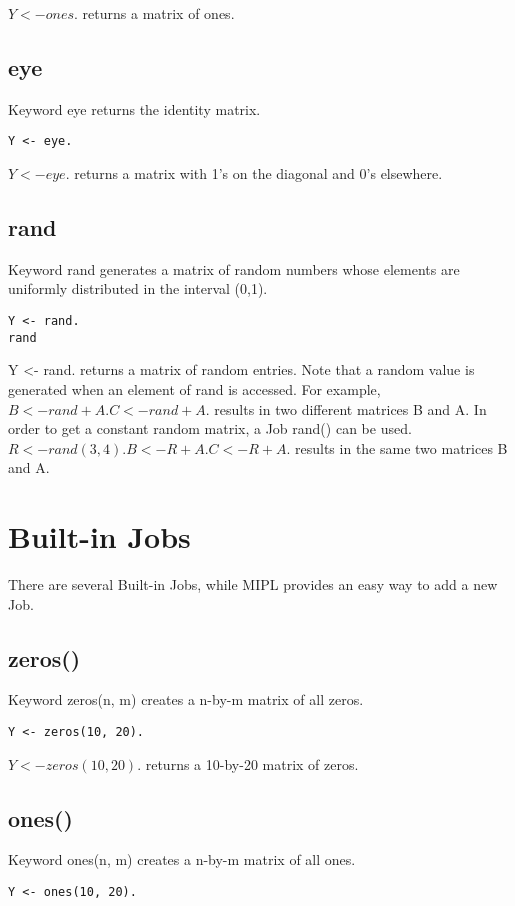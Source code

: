 \documentclass[prodmode,acmtecs]{acmsmall}
\begin{document}
$Y <- ones.$ returns a matrix of ones.
\medskip

\subsection{eye}
Keyword eye returns the identity matrix.
\begin{lstlisting}
Y <- eye.
\end{lstlisting}

$Y <- eye.$ returns a matrix with 1's on the diagonal and 0's elsewhere.
\medskip

\subsection{rand}
Keyword rand generates a matrix of random numbers whose elements are
uniformly distributed in the interval (0,1).
\begin{lstlisting}
Y <- rand.
rand
\end{lstlisting}

Y <- rand. returns a matrix of random entries. Note that a random value
is generated when an element of rand is accessed. For example,
$B <- rand + A. C <- rand + A.$ results in two different matrices B and A.
In order to get a constant random matrix, a Job rand() can be used.
$R <- rand(3,4). B <- R + A. C <- R + A.$ results in the same two matrices B
and A.


\section{Built-in Jobs}
There are several Built-in Jobs, while MIPL provides an easy way
to add a new Job.
\medskip

\subsection{zeros()}
Keyword zeros(n, m) creates a n-by-m matrix of all zeros.
\begin{lstlisting}
Y <- zeros(10, 20).
\end{lstlisting}

$Y <- zeros(10, 20).$ returns a 10-by-20 matrix of zeros.
\medskip

\subsection{ones()}
Keyword ones(n, m) creates a n-by-m matrix of all ones.
\begin{lstlisting}
Y <- ones(10, 20).
\end{lstlisting}
\end{document}
